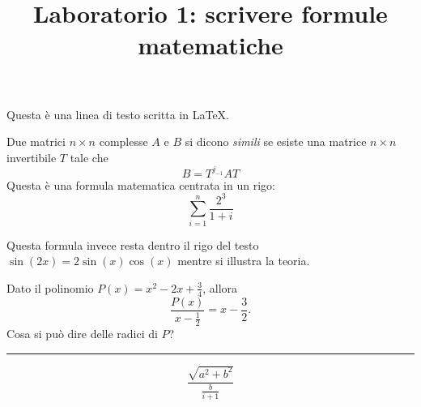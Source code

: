 \documentclass[12pt]{article}
\title{Laboratorio 1: scrivere formule matematiche}
\begin{document}
\maketitle


Questa \`e una linea di                 
 testo scritta in \LaTeX.










\bigskip

Due matrici $n \times n$ complesse
$A$ e $B$ si dicono \emph{simili}
se esiste una matrice $n \times n$
invertibile $T$ tale che
$$
B=T^{j_{-1}}AT
$$
Questa \`e una formula matematica centrata in un rigo:
\[
    \sum_{i=1}^n \frac{2^3}{1+i}
\]


Questa formula invece resta dentro il rigo del testo
$\sin(2x) = 2 \sin(x) \cos(x) $ mentre si illustra la teoria.


\medskip

Dato il polinomio $P(x)=x^2-2x+\frac 34$, allora
$$
\frac {P(x)}{x-\frac12}=x-\frac 32  .
$$
Cosa si pu\`o dire delle radici di $P$?

\medskip
\hrule

\[
\frac{\sqrt{a^2+b^2}}{\frac{b}{i+1}}
\]
\end{document}
